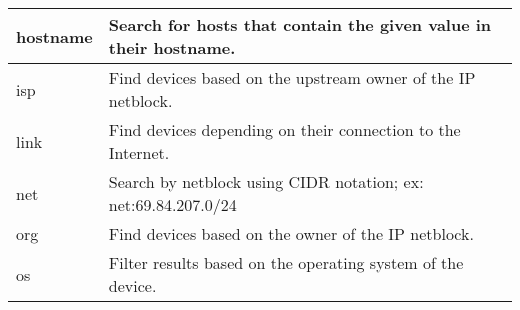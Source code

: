 \begin{table}[H]
{\begin{tabular}{|l|l|}
\hline
hostname                                                                        & Search for hosts that contain the given value in their hostname.                                                                                                                                                                                                                                                                                                            \\ 
\hline
isp                                                                             & Find devices based on the upstream owner of the IP netblock.                                                                                                                                                                                                                                                                                                                \\ 
\hline
link                                                                            & Find devices depending on their connection to the Internet.                                                                                                                                                                                                                                                                                                                 \\ 
\hline
net                                                                             & Search by netblock using CIDR notation; ex: net:69.84.207.0/24                                                                                                                                                                                                                                                                                                              \\ 
\hline
org                                                                             & Find devices based on the owner of the IP netblock.                                                                                                                                                                                                                                                                                                                         \\ 
\hline
os                                                                              & Filter results based on the operating system of the device.                                                                                                                                                                                                                                                                                                                 \\ 

\end{tabular}}
\end{table}
